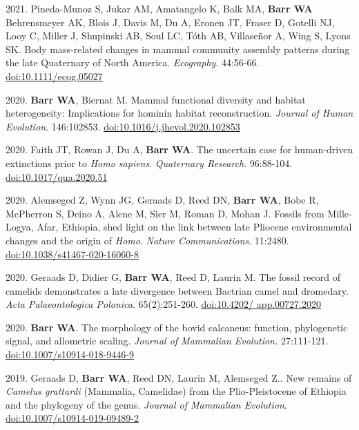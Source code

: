 \begin{etaremune}
\item 2021. Pineda-Munoz S, Jukar AM, Amatangelo K, Balk MA, {\bfseries Barr WA} Behrensmeyer AK, Blois J, Davis M, Du A, Eronen JT, Fraser D, Gotelli NJ, Looy C, Miller J, Shupinski AB, Soul LC, Tóth AB, Villaseñor A, Wing S, Lyons SK. Body mass-related changes in mammal community assembly patterns during the late Quaternary of North America. \emph{Ecography}. 44:56-66. \href{https://dx.doi.org/10.1111/ecog.05027}{doi:10.1111/ecog.05027}



\item 2020. {\bfseries Barr WA}, Biernat M. Mammal functional diversity and habitat heterogeneity: Implications for hominin habitat reconstruction. \emph{Journal of Human Evolution}. 146:102853. \href{https://dx.doi.org/10.1016/j.jhevol.2020.102853}{doi:10.1016/j.jhevol.2020.102853}

\item 2020. Faith JT, Rowan J, Du A, {\bfseries Barr WA}. The uncertain case for human-driven extinctions prior to \emph{Homo sapiens}. \emph{Quaternary Research}. 96:88-104. \href{https://dx.doi.org/10.1017/qua.2020.51}{doi:10.1017/qua.2020.51}

\item 2020. Alemseged Z, Wynn JG, Geraads D, Reed DN, {\bfseries Barr WA}, Bobe R, McPherron S, Deino A, Alene M, Sier M, Roman D,  Mohan J. Fossils from Mille-Logya, Afar, Ethiopia, shed light on the link between late Pliocene environmental changes and the origin of \emph{Homo}. \emph{Nature Communications}. 11:2480. \href{https://doi.org/10.1038/s41467-020-16060-8 }{doi:10.1038/s41467-020-16060-8}

\item 2020. Geraads D, Didier G, {\bfseries Barr WA}, Reed D, Laurin M. The fossil record of camelids demonstrates a late divergence between Bactrian camel and dromedary. \emph{Acta Palaeontologica Polonica}. 65(2):251-260. \href{https://doi.org/10.4202/app.00727.2020}{doi:10.4202/ app.00727.2020}

\item 2020. {\bfseries Barr WA}. The morphology of the bovid calcaneus: function, phylogenetic signal, and allometric scaling. \emph{Journal of Mammalian Evolution.}  27:111-121. \href{https://dx.doi.org/10.1007/s10914-018-9446-9}{doi:10.1007/s10914-018-9446-9}


\item 2019. Geraads D, {\bfseries Barr WA}, Reed DN, Laurin M, Alemseged Z.. New remains of \emph{Camelus grattardi} (Mammalia, Camelidae) from the Plio-Pleistocene of Ethiopia and the phylogeny of the genus. \emph{Journal of Mammalian Evolution}. \href{https://doi.org/10.1007/s10914-019-09489-2}{doi:10.1007/s10914-019-09489-2}


\end{etaremune}
